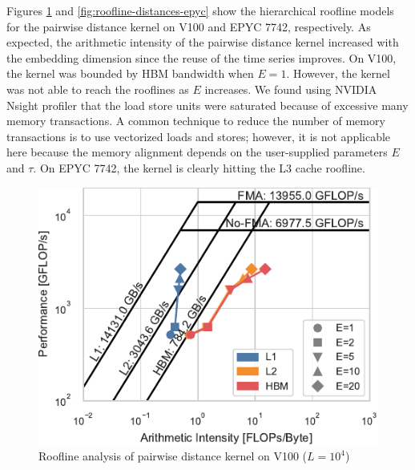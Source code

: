 \documentclass[sigconf]{acmart}
\begin{document}

Figures \ref{fig:roofline-distances-v100} and \ref{fig:roofline-distances-epyc}
show the hierarchical roofline models for the pairwise distance kernel on V100
and EPYC 7742, respectively. As expected, the arithmetic intensity of the
pairwise distance kernel increased with the embedding dimension since the
reuse of the time series improves. On V100, the kernel was bounded by HBM
bandwidth when $E=1$. However, the kernel was not able to reach the rooflines
as $E$ increases. We found using NVIDIA Nsight profiler that the load store
units were saturated because of excessive many memory transactions. A common
technique to reduce the number of memory transactions is to use vectorized
loads and stores; however, it is not applicable here because the memory
alignment depends on the user-supplied parameters $E$ and $\tau$. On EPYC 7742,
the kernel is clearly hitting the L3 cache roofline.

\begin{figure}
    \centering
    \includegraphics{figs/roofline_distances_v100}
    \caption{Roofline analysis of pairwise distance kernel on V100 ($L=10^4$)}%
    \label{fig:roofline-distances-v100}
\end{figure}
\end{document}
